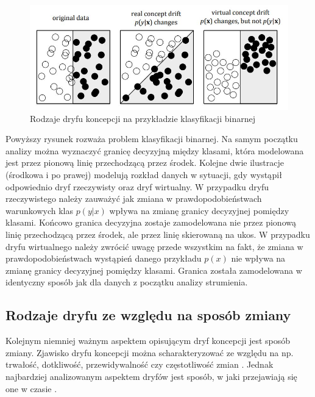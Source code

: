 \begin{figure}[h] 
    \centering\includegraphics[width=14cm]{figures/types_of_drift.JPG}
    \caption{Rodzaje dryfu koncepcji na przykładzie klasyfikacji binarnej \cite{Article:DriftGama2}}
\end{figure}

\noindent Powyższy rysunek rozważa problem klasyfikacji binarnej. Na samym początku analizy można wyznaczyć granicę decyzyjną między klasami, która modelowana jest przez pionową linię przechodzącą przez środek. Kolejne dwie ilustracje (środkowa i po prawej) modelują rozkład danych w sytuacji, gdy wystąpił odpowiednio dryf rzeczywisty oraz dryf wirtualny. W przypadku dryfu rzeczywistego należy zauważyć jak zmiana w prawdopodobieństwach warunkowych klas $p(y|x)$ wpływa na zmianę granicy decyzyjnej pomiędzy klasami. Końcowo granica decyzyjna zostaje zamodelowana nie przez pionową linię przechodzącą przez środek, ale przez linię skierowaną na ukos. W przypadku dryfu wirtualnego należy zwrócić uwagę przede wszystkim na fakt, że zmiana w prawdopodobieństwach wystąpień danego przykładu $p(x)$ nie wpływa na zmianę granicy decyzyjnej pomiędzy klasami. Granica została zamodelowana w identyczny sposób jak dla danych z początku analizy strumienia.

\subsection{Rodzaje dryfu ze względu na sposób zmiany}

\noindent Kolejnym niemniej ważnym aspektem opisującym dryf koncepcji jest sposób zmiany. Zjawisko dryfu koncepcji można scharakteryzować ze względu na np. trwałość, dotkliwość, przewidywalność czy częstotliwość zmian \cite{Article:DriftType}\cite{Article:DriftType2}. Jednak najbardziej analizowanym aspektem dryfów jest sposób, w jaki przejawiają się one w czasie \cite{Article:DriftGama}\cite{Article:DriftType3}.

\newpage

